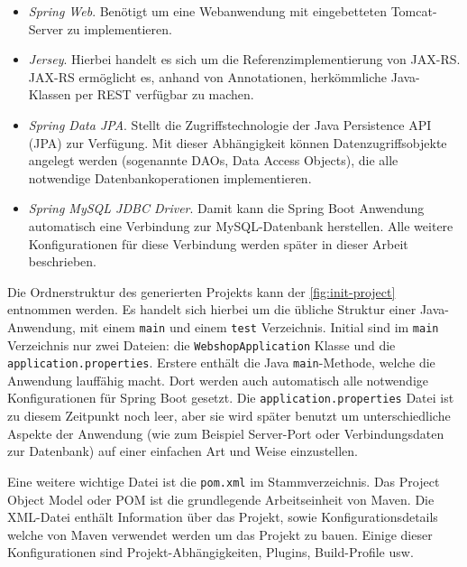 \begin{itemize}
	\item \textit{Spring Web}. Benötigt um eine Webanwendung mit eingebetteten Tomcat-Server zu implementieren.
	\item \textit{Jersey}. Hierbei handelt es sich um die Referenzimplementierung von JAX-RS. JAX-RS ermöglicht es, anhand von Annotationen, herkömmliche Java-Klassen per REST verfügbar zu machen\cite{Oracle2015}. 
	\item \textit{Spring Data JPA}. Stellt die Zugriffstechnologie der Java Persistence API (\acs{JPA}) zur Verfügung. Mit dieser Abhängigkeit können Datenzugriffsobjekte angelegt werden (sogenannte \acs{DAO}s, Data Access Objects), die alle notwendige Datenbankoperationen implementieren\cite{Webb2017}.
	\item \textit{Spring MySQL JDBC Driver}. Damit kann die Spring Boot Anwendung automatisch eine Verbindung zur MySQL-Datenbank herstellen\cite{Webb2017}. Alle weitere Konfigurationen für diese Verbindung werden später in dieser Arbeit beschrieben.
\end{itemize}

Die Ordnerstruktur des generierten Projekts kann der \cref{fig:init-project} entnommen werden. Es handelt sich hierbei um die übliche Struktur einer Java-Anwendung, mit einem \texttt{main} und einem \texttt{test} Verzeichnis. Initial sind im \texttt{main} Verzeichnis nur zwei Dateien: die \texttt{WebshopApplication} Klasse und die \texttt{application.properties}. Erstere enthält die Java \texttt{main}-Methode, welche die Anwendung lauffähig macht. Dort werden auch automatisch alle notwendige Konfigurationen für Spring Boot gesetzt. Die \texttt{application.properties} Datei ist zu diesem Zeitpunkt noch leer, aber sie wird später benutzt um unterschiedliche Aspekte der Anwendung (wie zum Beispiel Server-Port oder Verbindungsdaten zur Datenbank) auf einer einfachen Art und Weise einzustellen.

Eine weitere wichtige Datei ist die \texttt{pom.xml} im Stammverzeichnis. Das Project Object Model oder \acs{POM} ist die grundlegende Arbeitseinheit von Maven. Die XML-Datei enthält Information über das Projekt, sowie Konfigurationsdetails welche von Maven verwendet werden um das Projekt zu bauen. Einige dieser Konfigurationen sind Projekt-Abhängigkeiten, Plugins, Build-Profile usw.\cite{Foundation2017}

